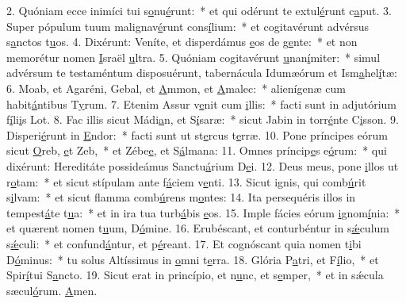2. Quóniam ecce inimíci tui s\uline{o}nu\uline{é}runt:~* et qui odérunt te extul\uline{é}runt c\uline{a}put.
3. Super pópulum tuum malignav\uline{é}runt cons\uline{í}lium:~* et cogitavérunt advérsus s\uline{a}nctos t\uline{u}os.
4. Dixérunt: Veníte, et disperdámus \uline{e}os de g\uline{e}nte:~* et non memorétur nomen \uline{I}sraël \uline{u}ltra.
5. Quóniam cogitavérunt \uline{u}nan\uline{í}miter:~* simul advérsum te testaméntum disposuérunt, tabernácula Idumæórum et Ism\uline{a}hel\uline{í}tæ:
6. Moab, et Agaréni, Gebal, et \uline{A}mmon, et \uline{A}malec:~* alienígenæ cum habit\uline{á}ntibus T\uline{y}rum.
7. Etenim Assur v\uline{e}nit cum \uline{i}llis:~* facti sunt in adjutórium f\uline{í}li\uline{i}s Lot.
8. Fac illis sicut Mádi\uline{a}n, et S\uline{í}saræ:~* sicut Jabin in torr\uline{é}nte C\uline{i}sson.
9. Disperi\uline{é}runt in \uline{E}ndor:~* facti sunt ut st\uline{e}rcus t\uline{e}rræ.
10. Pone príncipes eórum sicut \uline{O}reb, \uline{e}t Zeb,~* et Zébe\uline{e}, et S\uline{á}lmana:
11. Omnes príncip\uline{e}s e\uline{ó}rum:~* qui dixérunt: Hereditáte possideámus Sanctu\uline{á}rium D\uline{e}i.
12. Deus meus, pone \uline{i}llos ut r\uline{o}tam:~* et sicut stípulam ante f\uline{á}ciem v\uline{e}nti.
13. Sicut ignis, qui comb\uline{ú}rit s\uline{i}lvam:~* et sicut flamma comb\uline{ú}rens m\uline{o}ntes:
14. Ita persequéris illos in tempest\uline{á}te t\uline{u}a:~* et in ira tua turb\uline{á}bis \uline{e}os.
15. Imple fácies eórum \uline{i}gnom\uline{í}nia:~* et quærent nomen t\uline{u}um, D\uline{ó}mine.
16. Erubéscant, et conturbéntur in s\uline{ǽ}culum s\uline{ǽ}culi:~* et confund\uline{á}ntur, et p\uline{é}reant.
17. Et cognóscant quia nomen t\uline{i}bi D\uline{ó}minus:~* tu solus Altíssimus in \uline{o}mni t\uline{e}rra.
18. Glória P\uline{a}tri, et F\uline{í}lio,~* et Spir\uline{í}tui S\uline{a}ncto.
19. Sicut erat in princípio, et n\uline{u}nc, et s\uline{e}mper,~* et in sǽcula sæcul\uline{ó}rum. \uline{A}men.
